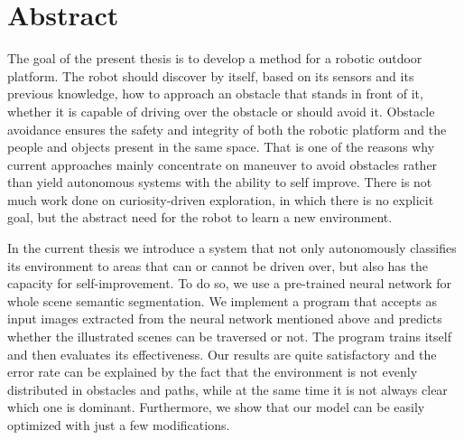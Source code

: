 \documentclass[12pt,a4paper,table,dvipsnames,tikz]{report}
\begin{document}
	\setmainfont[Ligatures={Common,TeX}]{Arial} %
	\setsansfont[Mapping=tex-text,Scale=MatchLowercase]{Arial}
	
	
	\fancyhf{}
	\fancyhead[LEO]{{\footnotesize \@titleEn{}}}
	\fancyfoot[C]{{\footnotesize \thepage}}
	\fancyfoot[LE,RO]{{\footnotesize \@authorFirstAbrEn{} \@authorLastEn{}}}
	
	 {
		\fancyhf{}
		\fancyhead[LO]{{\footnotesize \@titleEn{}}}
		\fancyfoot[C]{{\footnotesize \thepage}}   
		\fancyfoot[LE,RO]{{\footnotesize \@authorFirstAbrEn{} \@authorLastEn{}}}
	}
	\renewcommand{\headrulewidth}{0pt}
	
	
		
		
	\chapter*{Abstract}
	\thispagestyle{empty}
	
	The goal of the present thesis is to develop a method for a robotic outdoor platform. 
	The robot should discover by itself, based on its sensors and its previous knowledge, 
	how to approach an obstacle that stands in front of it, whether it is capable of 
	driving over the obstacle or should avoid it.	
	Obstacle avoidance ensures the safety and integrity of both the robotic platform and the 
	people and objects present in the same space. That is one of the reasons why 
	current approaches mainly concentrate on maneuver to avoid obstacles rather 
	than yield autonomous systems with the ability to self improve.
	There is not much work done on curiosity-driven exploration, in which there is no 
	explicit goal, but the abstract need for the robot to learn a new environment.
	\par
	In the current thesis we introduce a system that not only autonomously classifies 
	its environment to areas that can or cannot be driven over, but also has the capacity 
	for self-improvement.
	To do so, we use a pre-trained neural network for whole scene semantic segmentation.
	We implement a program that accepts as input images extracted from the neural network
	mentioned above and	predicts whether the illustrated scenes can be traversed or not. 
	The program trains itself and then evaluates its effectiveness.
	Our results are quite satisfactory and the error rate can be explained by the fact 
	that the environment is not evenly distributed in obstacles and paths, while at the 
	same time it is not always clear which one is dominant.
	Furthermore, we show that our model can be easily optimized with just a few 
	modifications. 
	
\end{document}
